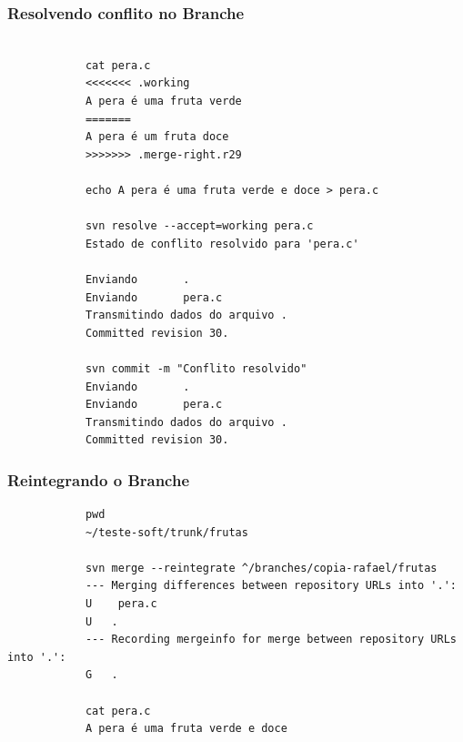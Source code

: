 \documentclass{beamer}
\begin{document}
\begin{frame}[fragile]
    \frametitle{Resolvendo conflito no Branche}

    \begin{bash}{}
        {\tiny
            \begin{verbatim}

            cat pera.c
            <<<<<<< .working
            A pera é uma fruta verde
            =======
            A pera é um fruta doce
            >>>>>>> .merge-right.r29

            echo A pera é uma fruta verde e doce > pera.c

            svn resolve --accept=working pera.c
            Estado de conflito resolvido para 'pera.c'

            Enviando       .
            Enviando       pera.c
            Transmitindo dados do arquivo .
            Committed revision 30.

            svn commit -m "Conflito resolvido"
            Enviando       .
            Enviando       pera.c
            Transmitindo dados do arquivo .
            Committed revision 30.
            \end{verbatim}
        }
    \end{bash}

\end{frame}
\begin{frame}[fragile]
    \frametitle{Reintegrando o Branche}

    \begin{bash}{}
        {\tiny
            \begin{verbatim}
            pwd
            ~/teste-soft/trunk/frutas

            svn merge --reintegrate ^/branches/copia-rafael/frutas
            --- Merging differences between repository URLs into '.':
            U    pera.c
            U   .
            --- Recording mergeinfo for merge between repository URLs into '.':
            G   .

            cat pera.c
            A pera é uma fruta verde e doce
            \end{verbatim}
        }
    \end{bash}

\end{frame}
\end{document}

